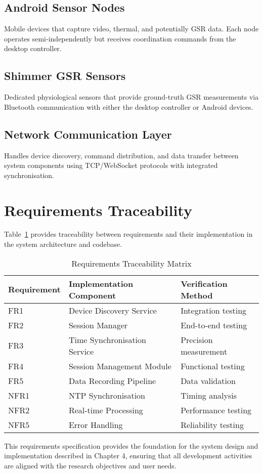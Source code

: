 \subsection{Android Sensor Nodes}
Mobile devices that capture video, thermal, and potentially GSR data. Each node operates semi-independently but receives coordination commands from the desktop controller.

\subsection{Shimmer GSR Sensors}
Dedicated physiological sensors that provide ground-truth GSR measurements via Bluetooth communication with either the desktop controller or Android devices.

\subsection{Network Communication Layer}
Handles device discovery, command distribution, and data transfer between system components using TCP/WebSocket protocols with integrated synchronisation.

\section{Requirements Traceability}

Table~\ref{tab:req_trace} provides traceability between requirements and their implementation in the system architecture and codebase.

\begin{table}[htbp]
\centering
\caption{Requirements Traceability Matrix}
\label{tab:req_trace}
\begin{tabular}{|l|l|l|}
\hline
\textbf{Requirement} & \textbf{Implementation Component} & \textbf{Verification Method} \\
\hline
FR1 & Device Discovery Service & Integration testing \\
FR2 & Session Manager & End-to-end testing \\
FR3 & Time Synchronisation Service & Precision measurement \\
FR4 & Session Management Module & Functional testing \\
FR5 & Data Recording Pipeline & Data validation \\
NFR1 & NTP Synchronisation & Timing analysis \\
NFR2 & Real-time Processing & Performance testing \\
NFR5 & Error Handling & Reliability testing \\
\hline
\end{tabular}
\end{table}

This requirements specification provides the foundation for the system design and implementation described in Chapter 4, ensuring that all development activities are aligned with the research objectives and user needs.
